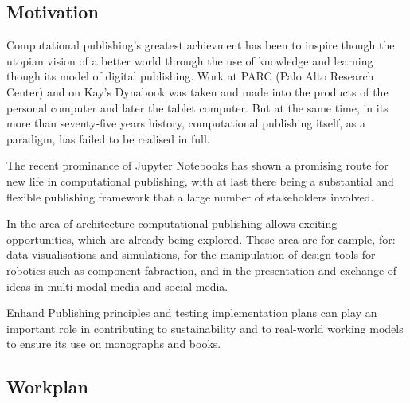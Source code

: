 \documentclass{article}
\begin{document}
\subsection{Motivation}\label{H2831995}



Computational publishing's greatest achievment has been to inspire though the utopian vision of a better world through the use of knowledge and learning though its model of digital publishing. Work at PARC (Palo Alto Research Center) and on Kay's Dynabook was taken and made into the products of the personal computer and later the tablet computer. But at the same time, in its more than seventy-five years history, computational publishing itself, as a paradigm, has failed to be realised in full. 


The recent prominance of Jupyter Notebooks has shown a promising route for new life in  computational publishing, with at last there being a substantial and flexible publishing framework that a large number of stakeholders involved.


In the area of architecture computational publishing allows exciting opportunities, which are already being explored. These area are for eample, for: data visualisations and simulations, for the manipulation of design tools for robotics such as component fabraction, and in the presentation and exchange of ideas in multi-modal-media and social media.


Enhand Publishing principles and testing implementation plans can play an important role in contributing to sustainability and to real-world working models to ensure its use on monographs and books.


\subsection{Workplan}\label{H819867}
\end{document}
